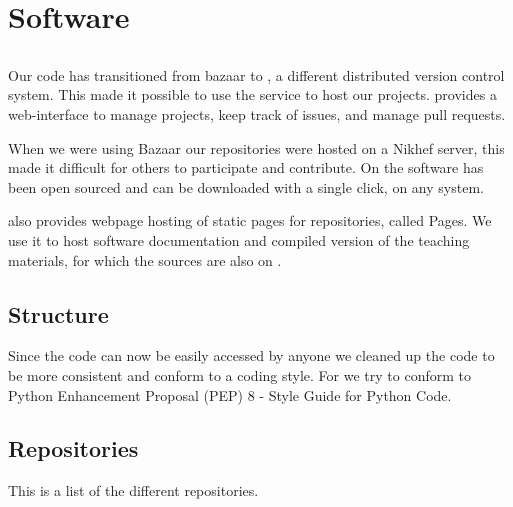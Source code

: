 \chapter{Software}
\label{ch:software}

\section{\github}

Our code has transitioned from bazaar to \git, a different distributed
version control system. This made it possible to use the service \github
to host our projects. \github provides a web-interface to manage
projects, keep track of issues, and manage pull requests.

When we were using Bazaar our repositories were hosted on a Nikhef
server, this made it difficult for others to participate and contribute.
On \github the software has been open sourced and can be downloaded with
a single click, on any system.

\github also provides webpage hosting of static pages for repositories,
called \github Pages. We use it to host software documentation and
compiled version of the teaching materials, for which the sources are
also on \github.


\section{Structure}

Since the code can now be easily accessed by anyone we cleaned up the
code to be more consistent and conform to a coding style. For \python we
try to conform to Python Enhancement Proposal (PEP) 8 - Style Guide for
Python Code.


\section{Repositories}

This is a list of the different repositories.


